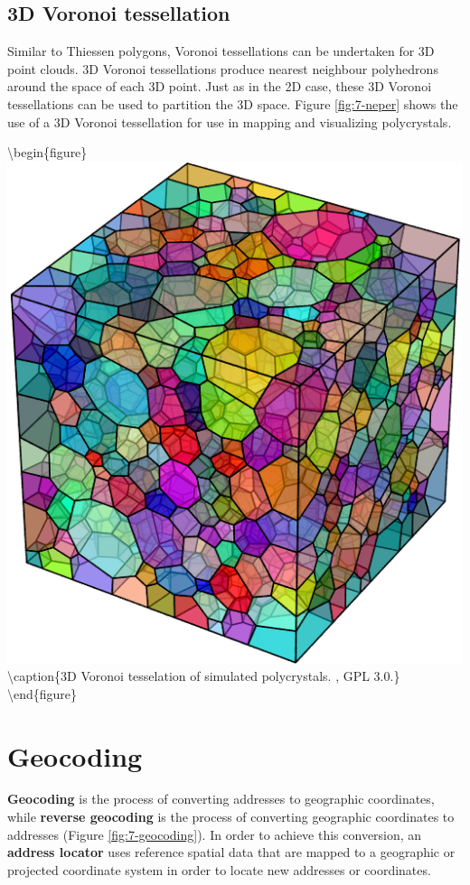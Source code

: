 \documentclass[
]{book}
\begin{document}
\hypertarget{d-voronoi-tessellation}{%
\subsection{3D Voronoi tessellation}\label{d-voronoi-tessellation}}

Similar to Thiessen polygons, Voronoi tessellations can be undertaken for 3D point clouds. 3D Voronoi tessellations produce nearest neighbour polyhedrons around the space of each 3D point. Just as in the 2D case, these 3D Voronoi tessellations can be used to partition the 3D space. Figure \ref{fig:7-neper} shows the use of a 3D Voronoi tessellation for use in mapping and visualizing polycrystals.

\textbackslash begin\{figure\}
\includegraphics[width=0.75\linewidth]{images/07-neper} \textbackslash caption\{3D Voronoi tesselation of simulated polycrystals. \citet{quey_neper_nodate}, GPL 3.0.\}\label{fig:7-neper}
\textbackslash end\{figure\}

\hypertarget{geocoding}{%
\section{Geocoding}\label{geocoding}}

\textbf{Geocoding} is the process of converting addresses to geographic coordinates, while \textbf{reverse geocoding} is the process of converting geographic coordinates to addresses (Figure \ref{fig:7-geocoding}). In order to achieve this conversion, an \textbf{address locator} uses reference spatial data that are mapped to a geographic or projected coordinate system in order to locate new addresses or coordinates.
\end{document}

